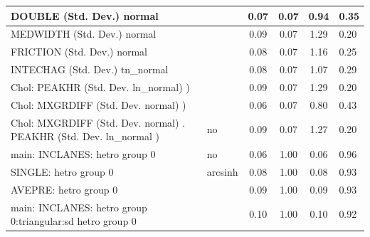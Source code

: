 \begin{table}
\begin{center}
\begin{tabular}{|l|l|c|c|c|l|}
			\hline
			DOUBLE (Std. Dev.) normal &  & 0.07 & 0.07 & 0.94 & 0.35 \\
			\hline
			MEDWIDTH (Std. Dev.) normal &  & 0.09 & 0.07 & 1.29 & 0.20 \\
			\hline
			FRICTION (Std. Dev.) normal &  & 0.08 & 0.07 & 1.16 & 0.25 \\
			\hline
			INTECHAG (Std. Dev.) tn_normal &  & 0.08 & 0.07 & 1.07 & 0.29 \\
			\hline
			 Chol: PEAKHR (Std. Dev. ln_normal) ) &  & 0.09 & 0.07 & 1.29 & 0.20 \\
			\hline
			 Chol: MXGRDIFF (Std. Dev. normal) ) &  & 0.06 & 0.07 & 0.80 & 0.43 \\
			\hline
			 Chol: MXGRDIFF (Std. Dev. normal) . PEAKHR (Std. Dev.   ln_normal ) & no & 0.09 & 0.07 & 1.27 & 0.20 \\
			\hline
			main: INCLANES: hetro group 0 & no & 0.06 & 1.00 & 0.06 & 0.96 \\
			\hline
			SINGLE: hetro group 0 & arcsinh & 0.08 & 1.00 & 0.08 & 0.93 \\
			\hline
			AVEPRE: hetro group 0 &  & 0.09 & 1.00 & 0.09 & 0.93 \\
			\hline
			main: INCLANES: hetro group 0:triangular:sd  hetro group 0 &  & 0.10 & 1.00 & 0.10 & 0.92 \\
			\hline
		\end{tabular}
	\end{center}
\end{table}